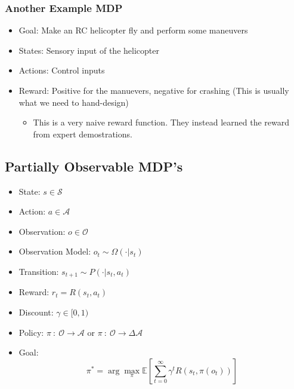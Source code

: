 \documentclass[10pt]{article}
\begin{document}
\subsubsection*{Another Example MDP}
\begin{itemize}
	\item Goal: Make an RC helicopter fly and perform some maneuvers
	\item States: Sensory input of the helicopter
	\item Actions: Control inputs
	\item Reward: Positive for the manuevers, negative for crashing  (This is usually what we need to hand-design)
	\begin{itemize}
        \item This is a very naive reward function.  They instead learned the reward from expert demostrations.
    \end{itemize}
\end{itemize}

\subsection*{Partially Observable MDP's}
\begin{itemize}
	\item State: $s \in \mathcal{S}$
	\item Action: $a \in \mathcal{A}$
	\item Observation: $o \in \mathcal{O}$
	\item Observation Model: $o_t \sim \Omega(\cdot | s_t)$
	\item Transition: $s_{t + 1} \sim P(\cdot | s_t, a_t)$
	\item Reward: $r_t = R(s_t, a_t)$
	\item Discount: $\gamma \in [0, 1)$
	\item Policy: $\pi \::\: \mathcal{O} \rightarrow \mathcal{A}$ or $\pi \::\: \mathcal{O} \rightarrow \Delta \mathcal{A}$
	\item Goal: 
	\[\pi^* = \arg \max_\pi \mathbb{E} \left[\sum_{t = 0}^\infty \gamma^t R(s_t, \pi(o_t))\right]\]
\end{itemize}
\end{document}
